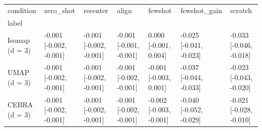 \begin{tabular}{lllllll}
\toprule
condition & zero\_shot & recenter & align & fewshot & fewshot\_gain & scratch \\
label &  &  &  &  &  &  \\
\midrule
Isomap (d = 3) & -0.001 [-0.002, -0.001] & -0.001 [-0.002, -0.001] & -0.001 [-0.001, -0.001] & 0.000 [-0.001, 0.004] & -0.025 [-0.041, -0.023] & -0.033 [-0.046, -0.018] \\
UMAP (d = 3) & -0.001 [-0.002, -0.001] & -0.001 [-0.002, -0.001] & -0.001 [-0.002, -0.001] & -0.001 [-0.003, 0.001] & -0.037 [-0.044, -0.033] & -0.023 [-0.043, -0.020] \\
CEBRA (d = 3) & -0.001 [-0.002, -0.001] & -0.001 [-0.002, -0.001] & -0.001 [-0.002, -0.001] & -0.002 [-0.003, -0.001] & -0.040 [-0.052, -0.029] & -0.021 [-0.028, -0.010] \\
\bottomrule
\end{tabular}
